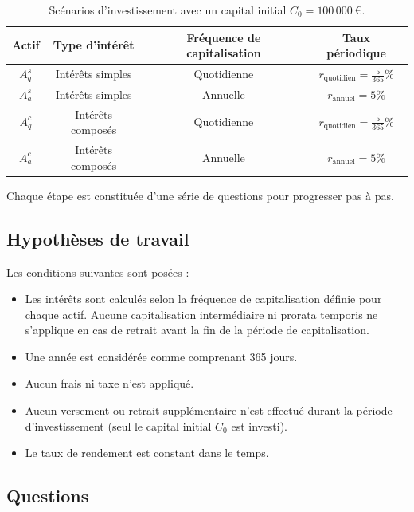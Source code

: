 \documentclass{article}
\begin{document}
\begin{table}[h!]
	\centering
	\begin{tabular}{|c|c|c|c|}
		\hline
		\textbf{Actif} & \textbf{Type d'intérêt} & \textbf{Fréquence de capitalisation} & \textbf{Taux périodique}                \\
		\hline
		\(A_q^s\)      & Intérêts simples        & Quotidienne                           & \(r_\text{quotidien} = \frac{5}{365}\%\) \\
		\hline
		\(A_a^s\)      & Intérêts simples        & Annuelle                              & \(r_\text{annuel} = 5\%\)                \\
		\hline
		\(A_q^c\)      & Intérêts composés      & Quotidienne                           & \(r_\text{quotidien} = \frac{5}{365}\%\) \\
		\hline
		\(A_a^c\)      & Intérêts composés      & Annuelle                              & \(r_\text{annuel} = 5\%\)                \\
		\hline
	\end{tabular}
	\caption{Scénarios d'investissement avec un capital initial \(C_0 = 100\,000\ \text{€}\).}
	\label{tab:scenarios}
\end{table}

Chaque étape est constituée d'une série de questions pour progresser pas à pas.

\subsection{Hypothèses de travail}
Les conditions suivantes sont posées :
\begin{itemize}
	\item Les intérêts sont calculés selon la fréquence de capitalisation définie pour chaque actif. Aucune capitalisation intermédiaire ni prorata temporis ne s'applique en cas de retrait avant la fin de la période de capitalisation.
	\item Une année est considérée comme comprenant 365 jours.
	\item Aucun frais ni taxe n'est appliqué.
	\item Aucun versement ou retrait supplémentaire n’est effectué durant la période d'investissement (seul le capital initial \( C_0 \) est investi).
	\item Le taux de rendement est constant dans le temps.
\end{itemize}

\subsection{Questions}
\end{document}
